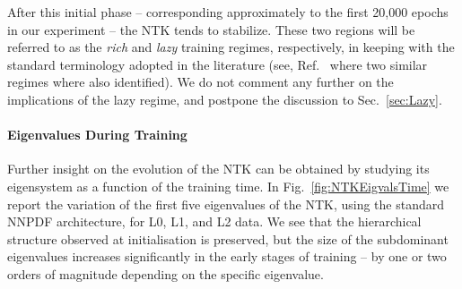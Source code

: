 After this initial phase -- corresponding approximately to the first 20,000
epochs in our experiment -- the NTK tends to stabilize. These two regions will
be referred to as the \textit{rich} and \textit{lazy} training regimes,
respectively, in keeping with the standard terminology adopted in the literature
(see, \eg Ref.~\cite{fort2020dlvk} where two similar regimes where also
identified). We do not comment any further on the implications of the lazy
regime, and postpone the discussion to Sec.~\ref{sec:Lazy}.

\FloatBarrier

\paragraph{Eigenvalues During Training}

Further insight on the evolution of the NTK can be obtained by studying its
eigensystem as a function of the training time. In Fig.~\ref{fig:NTKEigvalsTime}
we report the variation of the first five eigenvalues of the NTK, using the
standard NNPDF architecture, for L0, L1, and L2 data. We see that the
hierarchical structure observed at initialisation is preserved, but the size of
the subdominant eigenvalues increases significantly in the early stages of
training -- by one or two orders of magnitude depending on the specific
eigenvalue. 


